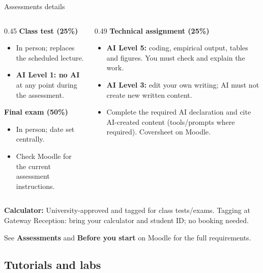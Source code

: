 \documentclass[9pt,aspectratio=169]{beamer}
\begin{document}
\begin{frame}{Assessments details}
\begin{columns}[T,onlytextwidth]
\begin{column}{0.45\textwidth}
\textcolor{StAndrewsBlue}{\textbf{Class test (25\%)}}
\begin{itemize}
    \item In person; replaces the scheduled lecture.
    \item \textbf{AI Level 1: no AI} at any point during the assessment.
\end{itemize}
\medskip
\textcolor{StAndrewsBlue}{\textbf{Final exam (50\%)}}
\begin{itemize}
    \item In person; date set centrally.
    \item Check Moodle for the current assessment instructions.
\end{itemize}
\end{column}
\begin{column}{0.49\textwidth}
\textcolor{StAndrewsBlue}{\textbf{Technical assignment (25\%)}}
\begin{itemize}
    \item \textbf{AI Level 5:} coding, empirical output, tables and figures. You must check and explain the work.
    \item \textbf{AI Level 3:} edit your own writing; AI must not create new written content.
    \item Complete the required AI declaration and cite AI-created content (tools/prompts where required). Coversheet on Moodle.
\end{itemize}
\end{column}
\end{columns}
\vspace{0.7em}
\textbf{Calculator:} University-approved and tagged for class tests/exams. Tagging at Gateway Reception: bring your calculator and student ID; no booking needed.
\par\smallskip
{\footnotesize See \textbf{Assessments} and \textbf{Before you start} on Moodle for the full requirements.\par}
\end{frame}

\subsection{Tutorials and labs}
\end{document}
